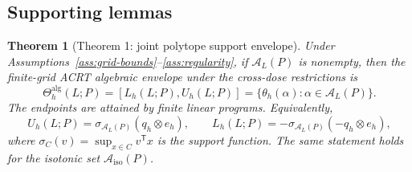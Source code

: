 \documentclass[11pt]{article}
\newcommand{\transpose}{\mathsf{T}}
\theoremstyle{definition}
\theoremstyle{plain}
\newtheorem{theorem}{Theorem}
\theoremstyle{remark}
\begin{document}
\subsection*{Supporting lemmas}
\begin{theorem}[Theorem 1: joint polytope support envelope]\label{thm:joint-envelope}
Under Assumptions~\ref{ass:grid-bounds}--\ref{ass:regularity}, if \(\mathcal A_L(P)\) is nonempty, then the finite-grid ACRT algebraic envelope under the cross-dose restrictions is
\[
  \Theta_h^{\mathrm{alg}}(L;P)=
  [L_h(L;P),U_h(L;P)]
  =
  \{\theta_h(\alpha):\alpha\in\mathcal A_L(P)\}.
\]
The endpoints are attained by finite linear programs.  Equivalently,
\[
  U_h(L;P)=\sigma_{\mathcal A_L(P)}(q_h\otimes e_h),
  \qquad
  L_h(L;P)=-\sigma_{\mathcal A_L(P)}(-q_h\otimes e_h),
\]
where \(\sigma_C(v)=\sup_{x\in C}v^\transpose x\) is the support function.
The same statement holds for the isotonic set
\(\mathcal A_{\mathrm{iso}}(P)\).
\end{theorem}
\end{document}

